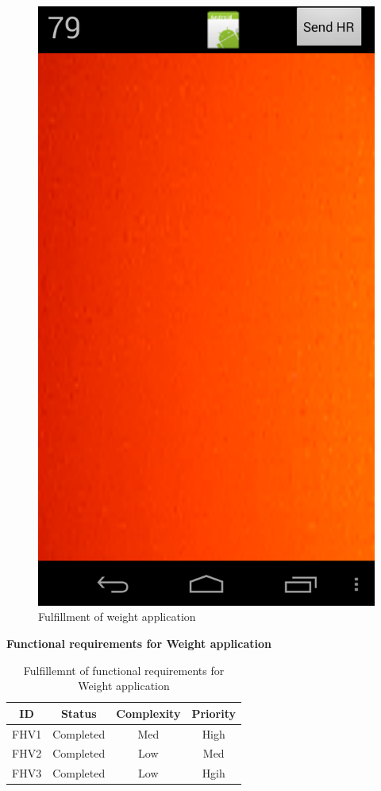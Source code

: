 \begin{figure}[H]
\centering
\includegraphics[scale=0.20]{../Figures/weightappfinal.png}
\caption{Fulfillment of weight application}
\label{figure:weightappfinal}
\end{figure}
\fi

\textbf{Functional requirements for Weight application}

\begin{table}[H]
\begin{center}
\begin{tabular}{ | c | c | c | c |}
  \hline
  \textbf{ID} & \textbf{Status} & \textbf{Complexity} & \textbf{Priority}\\
  \hline\noalign{\smallskip}\hline
  FHV1	& Completed & Med & High \\
  FHV2	& Completed & Low & Med \\
  FHV3	& Completed & Low & Hgih \\
  \hline
\end{tabular}
\end{center}
\caption{Fulfillemnt of functional requirements for Weight application}
\label{table:fulfillemntweightapp}
\end{table}

